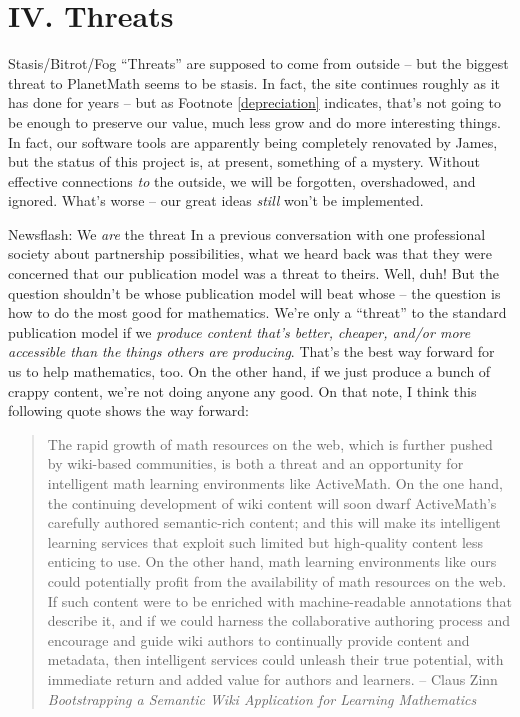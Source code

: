 \section*{IV. Threats}

\begin{paragraph}{Stasis/Bitrot/Fog}
``Threats'' are supposed to come from outside -- but the
  biggest threat to PlanetMath seems to be stasis.  In
  fact, the site continues roughly as it has done for
  years -- but as Footnote \ref{depreciation} indicates,
  that's not going to be enough to preserve our value,
  much less grow and do more interesting things.  In fact,
  our software tools are apparently being completely
  renovated by James, but the status of this project is,
  at present, something of a mystery.  Without effective
  connections \emph{to} the outside, we will be forgotten,
  overshadowed, and ignored.  What's worse -- our great
  ideas \emph{still} won't be implemented.
\end{paragraph}

\begin{paragraph}{Newsflash: We \emph{are} the threat}
In a previous conversation with one professional society
about partnership possibilities, what we heard back was
that they were concerned that our publication model was a
threat to theirs.  Well, duh!  But the question shouldn't
be whose publication model will beat whose -- the question
is how to do the most good for mathematics.  We're only a
``threat'' to the standard publication model if we
\emph{produce content that's better, cheaper, and/or more
  accessible than the things others are producing}.
That's the best way forward for us to help mathematics,
too.  On the other hand, if we just produce a bunch of
crappy content, we're not doing anyone any good.  On that
note, I think this following quote shows the way forward:
\begin{quote}
The rapid growth of math resources on the web, which is
further pushed by wiki-based communities, is both a threat
and an opportunity for intelligent math learning
environments like ActiveMath.  On the one hand, the
continuing development of wiki content will soon dwarf
ActiveMath's carefully authored semantic-rich content; and
this will make its intelligent learning services that
exploit such limited but high-quality content less
enticing to use.  On the other hand, math learning
environments like ours could potentially profit from the
availability of math resources on the web.  If such
content were to be enriched with machine-readable
annotations that describe it, and if we could harness the
collaborative authoring process and encourage and guide
wiki authors to continually provide content and metadata,
then intelligent services could unleash their true
potential, with immediate return and added value for
authors and learners.  -- Claus Zinn \emph{Bootstrapping a
  Semantic Wiki Application for Learning Mathematics}
\end{quote}
\end{paragraph}
